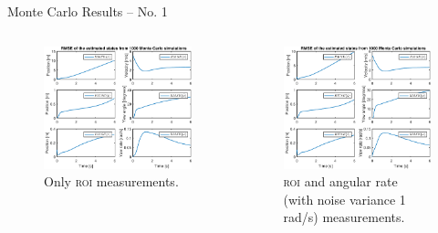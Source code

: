 \documentclass{beamer}
\newcommand{\roi}{\textsc{roi}\xspace}
\begin{document}
\begin{frame}{Monte Carlo Results -- No. 1}
	\begin{columns}[T]
	\begin{figure}
		\includegraphics[width=\textwidth]{MC/27_MC_1000_Rmse}
		\caption{Only \roi measurements.}
	\end{figure}
	\begin{figure}
		\includegraphics[width=\textwidth]{MC/22_MC_1000_Rmse}
		\caption{\roi and angular rate (with noise variance 1 rad/s) measurements.}
	\end{figure}
	\end{columns}
\end{frame}
\end{document}
